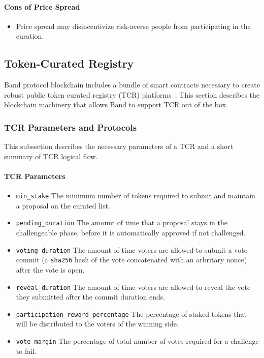 \documentclass[letterpaper,11pt]{article}
\begin{document}
\paragraph{Cons of Price Spread}
\begin{itemize}
\setlength\itemsep{0em}
\item Price spread may disincentivize risk-averse people from participating in the curation.
\end{itemize}

\subsection{Token-Curated Registry} \label{sec:token-curated-registry}
Band protocol blockchain includes a bundle of smart contracts necessary to create robust public token curated registry (TCR) platforms~\cite{tcrmike}. This section describes the blockchain machinery that allows Band to support TCR out of the box.

\subsubsection{TCR Parameters and Protocols}
This subsection describes the necessary parameters of a TCR and a short summary of TCR logical flow.

\paragraph{TCR Parameters}
\begin{itemize}
\setlength\itemsep{0em}
\item {\tt min\_stake} The minimum number of tokens required to submit and maintain a proposal on the curated list.
\item {\tt pending\_duration} The amount of time that a proposal stays in the challengeable phase, before it is automatically approved if not challenged.
\item {\tt voting\_duration} The amount of time voters are allowed to submit a vote commit (a {\tt sha256} hash of the vote concatenated with an arbritary nonce) after the vote is open.
\item {\tt reveal\_duration} The amount of time voters are allowed to reveal the vote they submitted after the commit duration ends. 
\item {\tt participation\_reward\_percentage} The percentage of staked tokens that will be distributed to the voters of the winning side. 
\item {\tt vote\_margin} The percentage of total number of votes required for a challenge to fail. 
\end{itemize}
\end{document}
